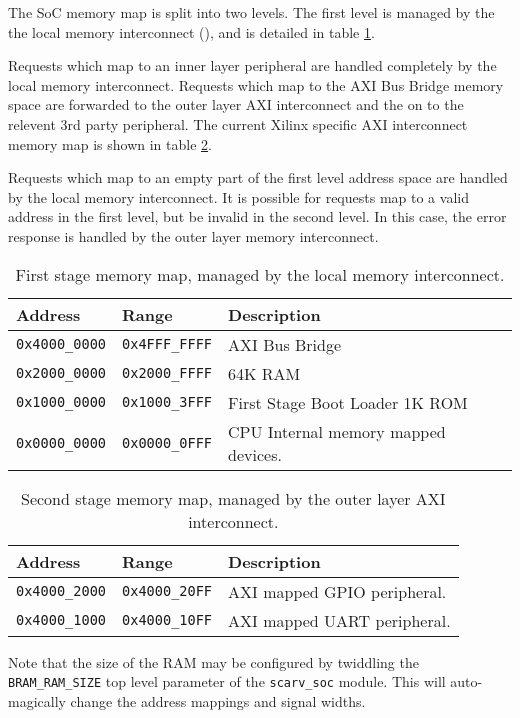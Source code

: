 
The SoC memory map is split into two levels.
The first level is managed by the the local memory interconnect
(),
and is detailed in table \ref{tab:memory-map:1}.

Requests which map to an inner layer peripheral are handled completely
by the local memory interconnect.
Requests which map to the AXI Bus Bridge memory space are forwarded to
the outer layer AXI interconnect and the on to the relevent 3rd party
peripheral.
The current Xilinx specific AXI interconnect memory map is shown in
table \ref{tab:memory-map:2}.

Requests which map to an empty part of the first level address space
are handled by the local memory interconnect.
It is possible for requests map to a valid address in the first
level, but be invalid in the second level.
In this case, the error response is handled by the
outer layer memory interconnect.

\begin{table}[H]
\centering
\begin{tabular}{lll}
Address      & Range        & Description   \\ \hline
{\tt 0x4000\_0000} & {\tt 0x4FFF\_FFFF} & AXI Bus Bridge                    \\
{\tt 0x2000\_0000} & {\tt 0x2000\_FFFF} & 64K RAM                           \\
{\tt 0x1000\_0000} & {\tt 0x1000\_3FFF} & First Stage Boot Loader 1K ROM    \\
{\tt 0x0000\_0000} & {\tt 0x0000\_0FFF} & CPU Internal memory mapped devices.
\end{tabular}
\caption{
    First stage \SCARVSOC memory map, managed by the local memory
    interconnect.
}
\label{tab:memory-map:1}
\end{table}

\begin{table}[H]
\centering
\begin{tabular}{lll}
Address      & Range        & Description  \\ \hline
{\tt 0x4000\_2000} & {\tt 0x4000\_20FF} & AXI mapped GPIO peripheral.  \\
{\tt 0x4000\_1000} & {\tt 0x4000\_10FF} & AXI mapped UART peripheral.  \\
\end{tabular}
\caption{
    Second stage \SCARVSOC memory map, managed by the outer layer
    AXI interconnect.
}
\label{tab:memory-map:2}
\end{table}

Note that the size of the RAM may be configured by twiddling the
{\tt BRAM\_RAM\_SIZE} top level parameter of the {\tt scarv\_soc}
module.
This will auto-magically change the address mappings and signal widths.


